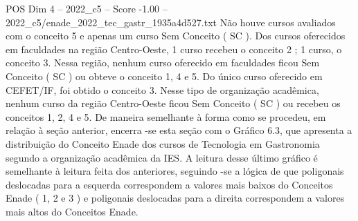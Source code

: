 \begin{textsample}{POS Dim 4 – 2022\_c5 – Score -1.00 – 2022\_c5/enade\_2022\_tec\_gastr\_1935a4d527.txt}
Não houve cursos avaliados com o conceito 5 e apenas um curso Sem Conceito ( SC ).
Dos cursos oferecidos em faculdades na região Centro-Oeste, 1 curso recebeu o conceito 2 ; 1 curso, o conceito 3.
Nessa região, nenhum curso oferecido em faculdades ficou Sem Conceito ( SC ) ou obteve o conceito 1, 4 e 5.
Do único curso oferecido em CEFET/IF, foi obtido o conceito 3.
Nesse tipo de organização acadêmica, nenhum curso da região Centro-Oeste ficou Sem Conceito ( SC ) ou recebeu os conceitos 1, 2, 4 e 5.
De maneira semelhante à forma como se procedeu, em relação à seção anterior, encerra -se esta seção com o Gráfico 6.3, que apresenta a distribuição do Conceito Enade dos cursos de Tecnologia em Gastronomia segundo a organização acadêmica da IES.
A leitura desse último gráfico é semelhante à leitura feita dos anteriores, seguindo -se a lógica de que poligonais deslocadas para a esquerda correspondem a valores mais baixos do Conceitos Enade ( 1, 2 e 3 ) e poligonais deslocadas para a direita correspondem a valores mais altos do Conceitos Enade.

\end{textsample}
